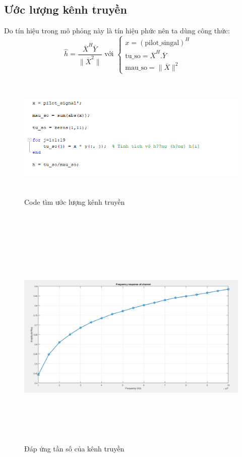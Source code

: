 \documentclass{article}
\begin{document}
\subsection{Ước lượng kênh truyền}
Do tín hiệu trong mô phỏng này là tín hiệu phức nên ta dùng công thức:
 $$\hat{h} = \frac{\overline{X}^H \overline{Y}}{\| \overline{X} ^2 \|} \text{ với } \begin{cases}
    x = (\text{pilot\_singal})^H  &\\
    \text{tu\_so} = \overline{X}^H.\overline{Y} &\\
    \text{mau\_so} = \|\overline{X}\|^2&
\end{cases}$$
\begin{figure}[h!]
    \centering
    \includegraphics[width=14cm, height =6cm]{photo/5.3.1.png}
    \caption{Code tìm ước lượng kênh truyền}
    \label{Hình 19}
\end{figure}\\
\begin{figure}[h!]
    \centering
    \includegraphics[width=13cm, height =11cm]{photo/5.3.2.png}
    \caption{Đáp ứng tần số của kênh truyền}
    \label{Hình 20}
\end{figure}
\end{document}
